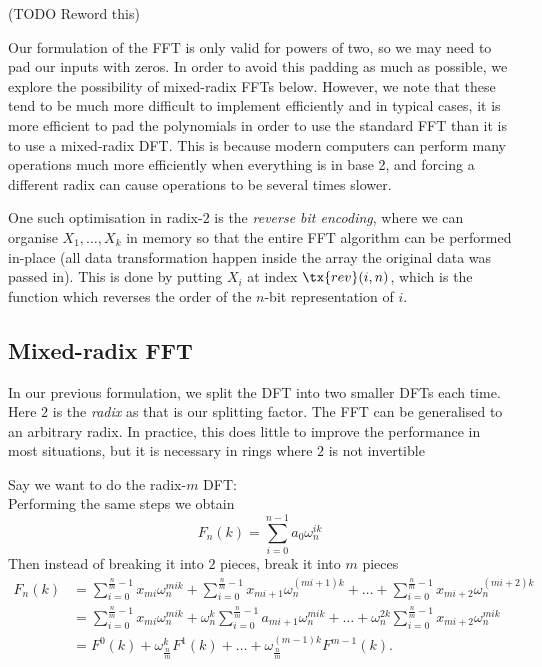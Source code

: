 \begin{remark}
    (TODO Reword this)

    \medskip

    Our formulation of the FFT is only valid for powers of two, so we may need to pad our inputs with zeros. In order to avoid this padding as much as possible, we explore the possibility of mixed-radix FFTs below. However, we note that these tend to be much more difficult to implement efficiently and in typical cases, it is more efficient to pad the polynomials in order to use the standard FFT than it is to use a mixed-radix DFT. This is because modern computers can perform many operations much more efficiently when everything is in base 2, and forcing a different radix can cause operations to be several times slower.

    One such optimisation in radix-$2$ is the \emph{reverse bit encoding}, where we can organise $X_1, \ldots, X_k$ in memory so that the entire FFT algorithm can be performed in-place (all data transformation happen inside the array the original data was passed in). This is done by putting $X_i$ at index $\tx{rev}(i, n)$, which is the function which reverses the order of the $n$-bit representation of $i$.
\end{remark}

\subsection{Mixed-radix FFT}

In our previous formulation, we split the DFT into two smaller DFTs each time. Here $2$ is the \emph{radix} as that is our splitting factor. The FFT can be generalised to an arbitrary radix. In practice, this does little to improve the performance in most situations, but it is necessary in rings where $2$ is not invertible

Say we want to do the radix-$m$ DFT:\\
Performing the same steps we obtain
\[
    F_n(k) = \sum^{n-1}_{i=0} a_0\omega_n^{ik}
\]
Then instead of breaking it into $2$ pieces, break it into $m$ pieces
\begin{align*}
    F_n(k) &= \sum^{\frac{n}{m}-1}_{i=0} x_{mi}\omega_n^{mik} + \sum^{\frac{n}{m}-1}_{i=0} x_{mi+1}\omega_n^{(mi+1)k} + \ldots + \sum^{\frac{n}{m}-1}_{i=0} x_{mi+2}\omega_n^{(mi+2)k}\\
          &= \sum^{\frac{n}{m}-1}_{i=0} x_{mi}\omega_n^{mik} + \omega_n^k\sum^{\frac{n}{m}-1}_{i=0} a_{mi+1}\omega_n^{mik} + \ldots +  \omega_n^{2k}\sum^{\frac{n}{m}-1}_{i=0} x_{mi+2}\omega_n^{mik}\\
          &= F^0(k) + \omega_{\frac{n}{m}}^k F^1(k) + \ldots + \omega_{\frac{n}{m}}^{(m-1)k} F^{m-1}(k).
\end{align*}


